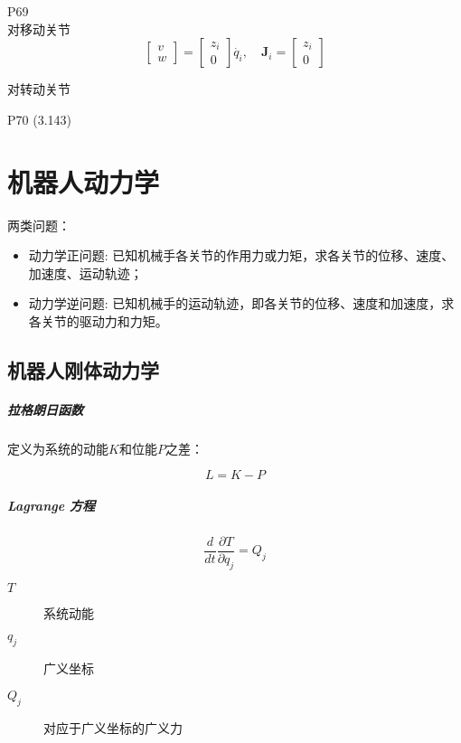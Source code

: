 \documentclass[11pt]{book}
\begin{document}
P69  \\

对移动关节
$$
	\left[
		\begin{matrix}
			v \\
			w
		\end{matrix}
	\right]
	=
	\left[
		\begin{matrix}
			z_i \\
			0
		\end{matrix}
	\right] \dot{q_i}
	,\quad
	\mathbf{J}_i = 
	\left[
		\begin{matrix}
			z_i \\
			0
		\end{matrix}
	\right]
$$

对转动关节

P70 (3.143)

\chapter{机器人动力学}

两类问题：
\begin{itemize}
	\item 动力学正问题: 
		已知机械手各关节的作用力或力矩，求各关节的位移、速度、加速度、运动轨迹；
	\item 动力学逆问题: 
		已知机械手的运动轨迹，即各关节的位移、速度和加速度，求各关节的驱动力和力矩。
\end{itemize}

\section{机器人刚体动力学}

\paragraph{拉格朗日函数}%
\label{par:la_ge_lang_ri_han_shu_}

定义为系统的动能$K$和位能$P$之差：

$$
	L = K - P
$$

\paragraph{Lagrange 方程}%
\label{par:lagrangefang_cheng_}

$$
	\frac{d}{dt} \frac{\partial T}{\partial q_j} = Q_j 
$$

\begin{description}
 \item[$T$] 系统动能
 \item[$q_j$] 广义坐标
 \item[$Q_j$] 对应于广义坐标的广义力
\end{description}
\end{document}
